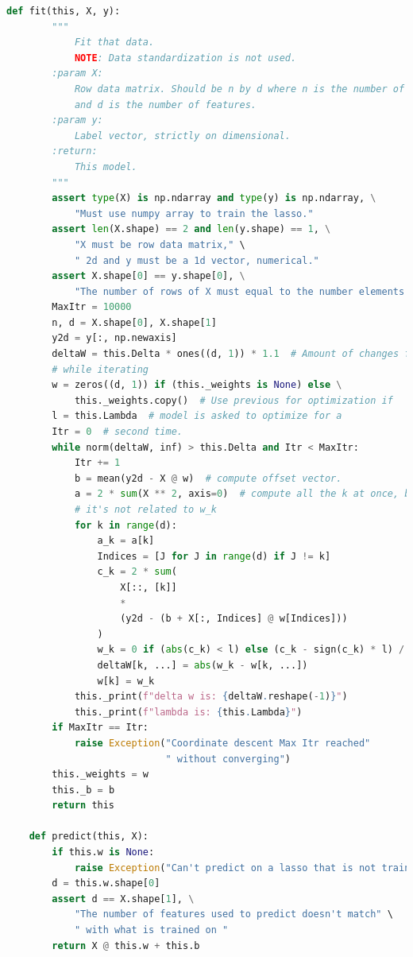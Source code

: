 \documentclass[]{article}
\begin{document}
\begin{lstlisting}[language=python]
    def fit(this, X, y):
        """
            Fit that data.
            NOTE: Data standardization is not used.
        :param X:
            Row data matrix. Should be n by d where n is the number of samples
            and d is the number of features.
        :param y:
            Label vector, strictly on dimensional.
        :return:
            This model.
        """
        assert type(X) is np.ndarray and type(y) is np.ndarray, \
            "Must use numpy array to train the lasso."
        assert len(X.shape) == 2 and len(y.shape) == 1, \
            "X must be row data matrix," \
            " 2d and y must be a 1d vector, numerical."
        assert X.shape[0] == y.shape[0], \
            "The number of rows of X must equal to the number elements in y. "
        MaxItr = 10000
        n, d = X.shape[0], X.shape[1]
        y2d = y[:, np.newaxis]
        deltaW = this.Delta * ones((d, 1)) * 1.1  # Amount of changes for each predictor
        # while iterating
        w = zeros((d, 1)) if (this._weights is None) else \
            this._weights.copy()  # Use previous for optimization if
        l = this.Lambda  # model is asked to optimize for a
        Itr = 0  # second time.
        while norm(deltaW, inf) > this.Delta and Itr < MaxItr:
            Itr += 1
            b = mean(y2d - X @ w)  # compute offset vector.
            a = 2 * sum(X ** 2, axis=0)  # compute all the k at once, because
            # it's not related to w_k
            for k in range(d):
                a_k = a[k]
                Indices = [J for J in range(d) if J != k]
                c_k = 2 * sum(
                    X[::, [k]]
                    *
                    (y2d - (b + X[:, Indices] @ w[Indices]))
                )
                w_k = 0 if (abs(c_k) < l) else (c_k - sign(c_k) * l) / a_k
                deltaW[k, ...] = abs(w_k - w[k, ...])
                w[k] = w_k
            this._print(f"delta w is: {deltaW.reshape(-1)}")
            this._print(f"lambda is: {this.Lambda}")
        if MaxItr == Itr:
            raise Exception("Coordinate descent Max Itr reached"
                            " without converging")
        this._weights = w
        this._b = b
        return this

    def predict(this, X):
        if this.w is None:
            raise Exception("Can't predict on a lasso that is not trained yet")
        d = this.w.shape[0]
        assert d == X.shape[1], \
            "The number of features used to predict doesn't match" \
            " with what is trained on "
        return X @ this.w + this.b


\end{lstlisting}
\end{document}
